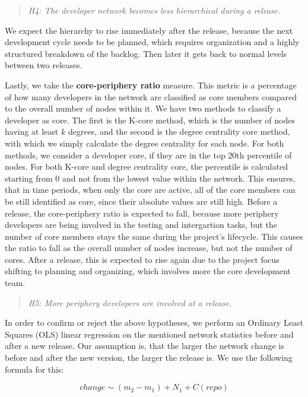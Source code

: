 \begin{quote}
    \textit{H4: The developer network becomes less hierarchical during a release.}
\end{quote}

We expect the hierarchy to rise immediately after the release, because the next development cycle needs to be planned, which requires organization and a highly structured breakdown of the backlog. Then later it gets back to normal levels between two releases.

Lastly, we take the \textbf{core-periphery ratio} measure. This metric is a percentage of how many developers in the network are classified as core members compared to the overall number of nodes within it. We have two methods to classify a developer as core. The first is the K-core method, which is the number of nodes having at least $k$ degrees, and the second is the degree centrality core method, with which we simply calculate the degree centrality for each node. For both methods, we consider a developer core, if they are in the top 20th percentile of nodes. For both K-core and degree centrality core, the percentile is calculated starting from 0 and not from the lowest value within the network. This ensures, that in time periods, when only the core are active, all of the core members can be still identified as core, since their absolute values are still high. Before a release, the core-periphery ratio is expected to fall, because more periphery developers are being involved in the testing and intergartion tasks, but the number of core members stays the same during the project's lifecycle. This causes the ratio to fall as the overall number of nodes increase, but not the number of cores. After a release, this is expected to rise again due to the project focus shifting to planning and organizing, which involves more the core development team.

\begin{quote}
    \textit{H5: More periphery developers are involved at a release.}
\end{quote}

In order to confirm or reject the above hypotheses, we perform an Ordinary Least Squares (OLS) linear regression on the mentioned network statistics before and after a new release. Our assumption is, that the larger the network change is before and after the new version, the larger the release is. We use the following formula for this:

 \[ change \sim (m_2 - m_1) + N_1 + C(repo) \]


